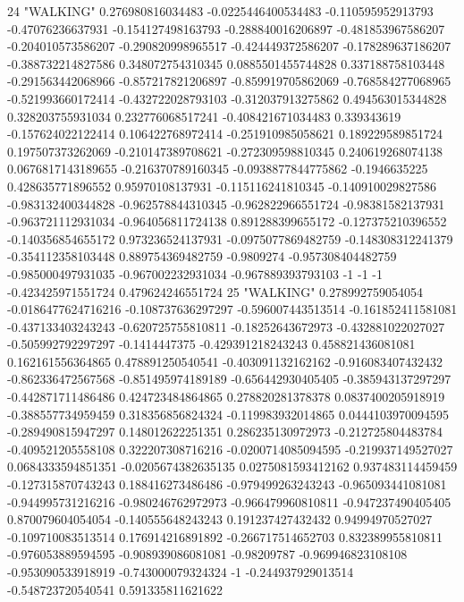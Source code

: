 24 "WALKING" 0.276980816034483 -0.0225446400534483 -0.110595952913793 -0.47076236637931 -0.154127498163793 -0.288840016206897 -0.481853967586207 -0.204010573586207 -0.290820998965517 -0.424449372586207 -0.178289637186207 -0.388732214827586 0.348072754310345 0.0885501455744828 0.337188758103448 -0.291563442068966 -0.857217821206897 -0.859919705862069 -0.768584277068965 -0.521993660172414 -0.432722028793103 -0.312037913275862 0.494563015344828 0.328203755931034 0.232776068517241 -0.408421671034483 0.339343619 -0.157624022122414 0.106422768972414 -0.251910985058621 0.189229589851724 0.197507373262069 -0.210147389708621 -0.272309598810345 0.240619268074138 0.0676817143189655 -0.216370789160345 -0.0938877844775862 -0.1946635225 0.428635771896552 0.95970108137931 -0.115116241810345 -0.140910029827586 -0.983132400344828 -0.962578844310345 -0.962822966551724 -0.98381582137931 -0.963721112931034 -0.964056811724138 0.891288399655172 -0.127375210396552 -0.140356854655172 0.973236524137931 -0.0975077869482759 -0.148308312241379 -0.354112358103448 0.889754369482759 -0.9809274 -0.957308404482759 -0.985000497931035 -0.967002232931034 -0.967889393793103 -1 -1 -1 -0.423425971551724 0.479624246551724
25 "WALKING" 0.278992759054054 -0.0186477624716216 -0.108737636297297 -0.596007443513514 -0.161852411581081 -0.437133403243243 -0.620725755810811 -0.18252643672973 -0.432881022027027 -0.505992792297297 -0.1414447375 -0.429391218243243 0.458821436081081 0.162161556364865 0.478891250540541 -0.403091132162162 -0.916083407432432 -0.862336472567568 -0.851495974189189 -0.656442930405405 -0.385943137297297 -0.442871711486486 0.424723484864865 0.278820281378378 0.0837400205918919 -0.388557734959459 0.318356856824324 -0.119983932014865 0.0444103970094595 -0.289490815947297 0.148012622251351 0.286235130972973 -0.212725804483784 -0.409521205558108 0.322207308716216 -0.0200714085094595 -0.219937149527027 0.0684333594851351 -0.0205674382635135 0.0275081593412162 0.937483114459459 -0.127315870743243 0.188416273486486 -0.979499263243243 -0.965093441081081 -0.944995731216216 -0.980246762972973 -0.966479960810811 -0.947237490405405 0.870079604054054 -0.140555648243243 0.191237427432432 0.94994970527027 -0.109710083513514 0.176914216891892 -0.266717514652703 0.832389955810811 -0.976053889594595 -0.908939086081081 -0.98209787 -0.969946823108108 -0.953090533918919 -0.743000079324324 -1 -0.244937929013514 -0.548723720540541 0.591335811621622
